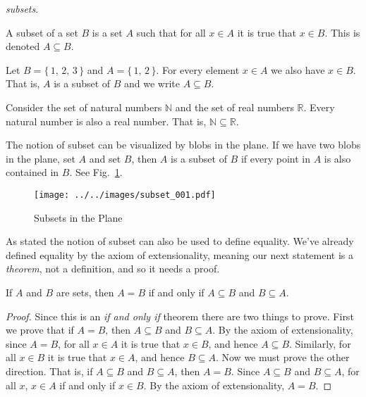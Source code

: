             \textit{subsets}.
            \begin{definition}
                A subset of a set $B$ is a set $A$ such that for all
                $x\in{A}$ it is true that $x\in{B}$. This is denoted
                $A\subseteq{B}$.
            \end{definition}
            \begin{example}
                Let $B=\{\,1,\,2,\,3\,\}$ and $A=\{\,1,\,2\,\}$. For every
                element $x\in{A}$ we also have $x\in{B}$. That is,
                $A$ is a subset of $B$ and we write $A\subseteq{B}$.
            \end{example}
            \begin{example}
                Consider the set of natural numbers $\mathbb{N}$ and the set of
                real numbers $\mathbb{R}$. Every natural number is also a
                real number. That is, $\mathbb{N}\subseteq\mathbb{R}$.
            \end{example}
            The notion of subset can be visualized by blobs in the plane.
            If we have two blobs in the plane, set $A$ and set $B$, then $A$ is
            a subset of $B$ if every point in $A$ is also contained in $B$.
            See Fig.~\ref{fig:subsets_in_plane}.
            \begin{figure}
                \centering
                \texttt{[image: ../../images/subset\_001.pdf]}
                \caption{Subsets in the Plane}
                \label{fig:subsets_in_plane}
            \end{figure}
            \par\hfill\par
            As stated the notion of subset can also be used to define equality.
            We've already defined equality by the axiom of extensionality,
            meaning our next statement is a \textit{theorem}, not a definition,
            and so it needs a proof.
            \begin{theorem}
                If $A$ and $B$ are sets, then $A=B$ if and only if
                $A\subseteq{B}$ and $B\subseteq{A}$.
            \end{theorem}
            \begin{proof}
                Since this is an \textit{if and only if} theorem there are two
                things to prove. First we prove that if $A=B$, then
                $A\subseteq{B}$ and $B\subseteq{A}$. By the axiom of
                extensionality, since $A=B$,
                for all $x\in{A}$ it is true that $x\in{B}$, and hence
                $A\subseteq{B}$. Similarly, for all $x\in{B}$ it is true that
                $x\in{A}$, and hence $B\subseteq{A}$. Now we must prove the
                other direction. That is, if $A\subseteq{B}$ and
                $B\subseteq{A}$, then $A=B$. Since $A\subseteq{B}$ and
                $B\subseteq{A}$, for all $x$, $x\in{A}$ if and only if
                $x\in{B}$. By the axiom of extensionality, $A=B$.
            \end{proof}
